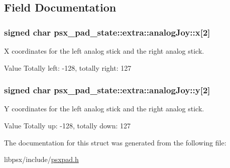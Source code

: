 \subsection{Field Documentation}
\hypertarget{structpsx__pad__state_1_1extra_1_1analogJoy_a7c91cf5c544d6224f03ce744b91f04d7}{}
\subsubsection[{x}]{\setlength{\rightskip}{0pt plus 5cm}signed char psx\+\_\+pad\+\_\+state\+::extra\+::analog\+Joy\+::x\mbox{[}2\mbox{]}}\label{structpsx__pad__state_1_1extra_1_1analogJoy_a7c91cf5c544d6224f03ce744b91f04d7}


X coordinates for the left analog stick and the right analog stick. 

\begin{DoxyParagraph}{Value }
Totally left\+: -\/128, totally right\+: 127 
\end{DoxyParagraph}
\hypertarget{structpsx__pad__state_1_1extra_1_1analogJoy_abbdd8d074005a21dde9bd8f0765f4710}{}
\subsubsection[{y}]{\setlength{\rightskip}{0pt plus 5cm}signed char psx\+\_\+pad\+\_\+state\+::extra\+::analog\+Joy\+::y\mbox{[}2\mbox{]}}\label{structpsx__pad__state_1_1extra_1_1analogJoy_abbdd8d074005a21dde9bd8f0765f4710}


Y coordinates for the left analog stick and the right analog stick. 

\begin{DoxyParagraph}{Value }
Totally up\+: -\/128, totally down\+: 127 
\end{DoxyParagraph}


The documentation for this struct was generated from the following file\+:\begin{DoxyCompactItemize}
\item 
libpsx/include/\hyperlink{psxpad_8h}{psxpad.\+h}\end{DoxyCompactItemize}
